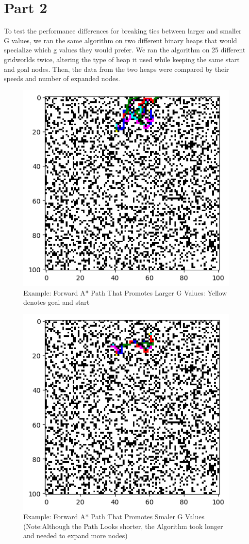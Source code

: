 \documentclass{article}
\begin{document}
\section{Part 2}
To test the performance differences for breaking ties between larger and smaller G values, we ran the same algorithm on two different binary heaps that would specialize which g values they would prefer. We ran the algorithm on 25 different gridworlds twice, altering the type of heap it used while keeping the same start and goal nodes. Then, the data from the two heaps were compared by their speeds and number of expanded nodes.
\begin{figure}
	\caption{Example: Forward A* Path That Promotes Larger G Values: Yellow denotes goal and start}
	\centering
	\includegraphics[scale=0.75]{visP2_1}
\end{figure}
\begin{figure}
	\caption{Example: Forward A* Path That Promotes Smaler G Values (Note:Although the Path Looks shorter, the Algorithm took longer and needed to expand more nodes)}
	\centering
	\includegraphics[scale=0.75]{visP2_2}
\end{figure}
\end{document}
